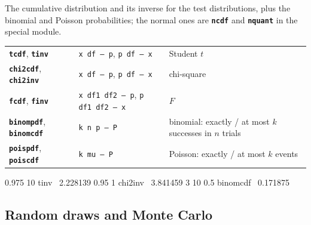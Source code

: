 \documentclass[11pt,letterpaper]{article}
\newcommand{\cmd}[1]{\texttt{\textbf{#1}}}
\newcommand{\stk}[1]{\texttt{#1}}
\begin{document}
The cumulative distribution and its inverse for the test distributions, plus the binomial and Poisson probabilities; the normal ones are \cmd{ncdf} and \cmd{nquant} in the special module.
\begin{center}
\begin{tabular}{@{}l>{\raggedright\arraybackslash}p{}>{\raggedright\arraybackslash}p{}@{}}
\toprule
\cmd{tcdf}, \cmd{tinv} & \stk{x df -- p}, \stk{p df -- x} & Student $t$ \\
\cmd{chi2cdf}, \cmd{chi2inv} & \stk{x df -- p}, \stk{p df -- x} & chi-square \\
\cmd{fcdf}, \cmd{finv} & \stk{x df1 df2 -- p}, \stk{p df1 df2 -- x} & $F$ \\
\cmd{binompdf}, \cmd{binomcdf} & \stk{k n p -- P} & binomial: exactly / at most $k$ successes in $n$ trials \\
\cmd{poispdf}, \cmd{poiscdf} & \stk{k mu -- P} & Poisson: exactly / at most $k$ events \\
\bottomrule
\end{tabular}
\end{center}
\begin{rpn}
0.975 10 tinv        \ 2.228139
0.95 1 chi2inv       \ 3.841459
3 10 0.5 binomcdf    \ 0.171875
\end{rpn}

\subsection{Random draws and Monte Carlo}
\end{document}
